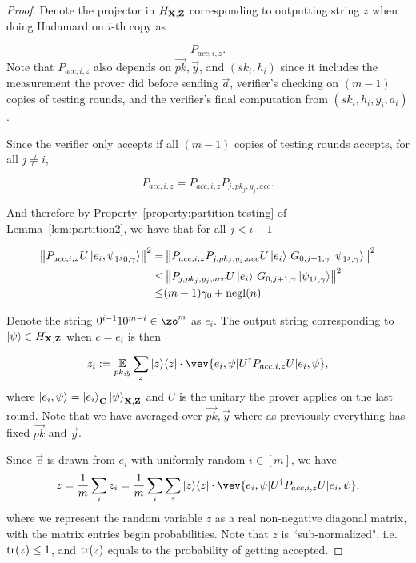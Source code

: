 \begin{proof}
Denote the projector in $H_{\mathbf{X},\mathbf{Z}}$ corresponding to outputting string $z$ when doing Hadamard on $i$-th copy as

$$P_{acc,i,z}.$$
Note that $P_{acc,i,z}$ also depends on $\vec{pk}, \vec{y}$, and $(sk_i, h_i)$ since it includes the measurement the prover did before sending $\vec{a}$,  verifier's checking on $(m-1)$ copies of testing rounds, and  the verifier's final computation from $(sk_i,h_i,y_i,a_i)$.

Since the verifier only accepts if all $(m-1)$ copies of testing rounds accepts, for all $j\neq i$,

$$P_{acc,i,z}=P_{acc,i,z}P_{j,pk_j,y_j,acc}.$$

And therefore by Property~\ref{property:partition-testing} of Lemma~\ref{lem:partition2}, we have that for all $j <i-1$   %

\begin{align} \label{eq:rejected-d}
    \left\lVert P_{acc,i,z} U \ket{e_i, \psi_{1^j0,\gamma}}\right\rVert^2
    =& \left\lVert P_{acc,i,z}P_{j,pk_j,y_j,acc} U \ket{e_i}\, G_{0,j+1,\gamma}\ket{\psi_{1^j,\gamma}}  \right\rVert^2 \nonumber \\
    \leq& \left\lVert P_{j,pk_j,y_j,acc} U \ket{e_i}\, G_{0,j+1,\gamma}\ket{\psi_{1^j,\gamma}}  \right\rVert^2 \nonumber \\
    \leq& (m-1)\gamma_0+\operatorname{negl}(n)
\end{align}


Denote the string $0^{i-1}10^{m-i} \in \zo^m $ as $e_i$. The output string corresponding to $\ket{\psi} \in H_{\mathbf{X},\mathbf{Z}}$ when $c=e_i$ is then




$$z_i\defeq \E_{pk,y} \sum_z \proj{z} \cdot \vev{e_i,\psi|U^\dag P_{acc,i,z} U|e_i,\psi},$$
where $\ket{e_i,\psi}=\ket{e_i}_{\mathbf{C}}\ket{\psi}_{\mathbf{X},\mathbf{Z}}$ and $U$ is the unitary the prover applies on the last round. Note that we have averaged over $\vec{pk}, \vec{y}$ where as previously everything has fixed $\vec{pk}$ and $\vec{y}$.

Since $\vec{c}$ is drawn  from $e_i$ with uniformly random $i\in [m]$, we have
$$ z=\frac{1}{m} \sum_i z_i= \frac{1}{m} \sum_i \sum_z \proj{z} \cdot \vev{e_i,\psi|U^\dag P_{acc,i,z} U|e_i,\psi},$$
    where we represent the random variable $z$ as a real non-negative diagonal matrix, with the matrix entries begin probabilities. Note that $z$ is ``sub-normalized", i.e. $\operatorname{tr} (z) \leq 1 \text{}$, and $\operatorname{tr}(z)$ equals to the probability of getting accepted.







\end{proof}
